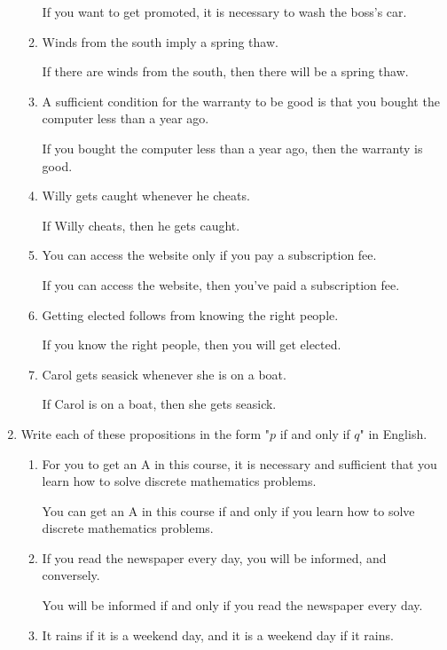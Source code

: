 \documentclass[11pt]{article}
\begin{document}
\begin{enumerate}[label=\textbf{\arabic*.}]
\begin{enumerate}[label=\textbf{\alph*)}]
		If you want to get promoted, it is necessary to wash the boss's car.
		
		\item Winds from the south imply a spring thaw.
		
		If there are winds from the south, then there will be a spring thaw.
		
		\item A sufficient condition for the warranty to be good is that you bought the computer less than a year ago.
		
		If you bought the computer less than a year ago, then the warranty is good.
		
		\item Willy gets caught whenever he cheats.
		
		If Willy cheats, then he gets caught.
		
		\item You can access the website only if you pay a subscription fee.
		
		If you can access the website, then you've paid a subscription fee.
		
		\item Getting elected follows from knowing the right people.
		
		If you know the right people, then you will get elected.
		
		\item Carol gets seasick whenever she is on a boat.
		
		If Carol is on a boat, then she gets seasick.
	\end{enumerate}

	\item Write each of these propositions in the form "$p$ if and only if $q$" in English.
	\begin{enumerate}[label=\textbf{\alph*)}]
		\item For you to get an A in this course, it is necessary and sufficient that you learn how to solve discrete mathematics problems.
		
		You can get an A in this course if and only if you learn how to solve discrete mathematics problems.
		
		\item If you read the newspaper every day, you will be informed, and conversely.
		
		You will be informed if and only if you read the newspaper every day.
		
		\item It rains if it is a weekend day, and it is a weekend day if it rains.
		

\end{enumerate}
\end{enumerate}
\end{document}
